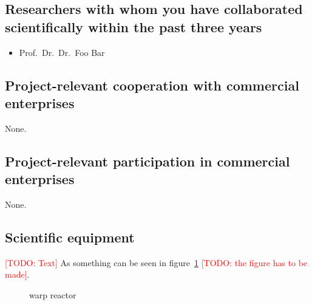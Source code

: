 \documentclass[american,firsttime]{dfgproposal}
\newcommand{\todo}[1]{\xspace{\textcolor{red}{[TODO: #1]}}\xspace}
\begin{document}
	\subsection{Researchers with whom you have collaborated scientifically within the past three years}
	\begin{itemize}
		\item Prof.\ Dr.\ Dr.\ Foo Bar
	\end{itemize}
	
	\subsection{Project-relevant cooperation with commercial enterprises}
	None.
	
	\subsection{Project-relevant participation in commercial enterprises}
	None.
	
	\subsection{Scientific equipment}
	\todo{Text}
	As something can be seen in figure~\ref{fig:some_nice_graph} \todo{the figure has to be made}.
	\begin{figure}
		\centering
		\caption{warp reactor}
		\label{fig:some_nice_graph}
	\end{figure}
	
\end{document}
